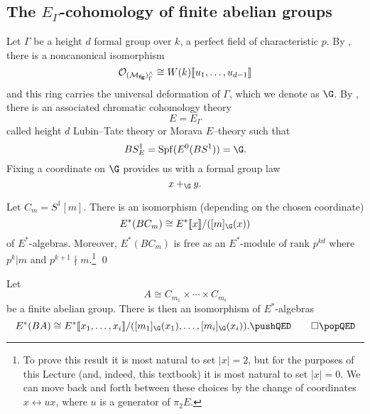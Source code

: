 
\subsection*{The \(E_{\Gamma}\)-cohomology of finite abelian groups}



Let \(\Gamma\) be a height \(d\) formal group over \(k\), a perfect field of characteristic \(p\). By , there is a noncanonical isomorphism 
\[
\mathcal{O}_{(\mathcal{M}_{\mathbf{fg}})^\wedge_\Gamma} \cong W(k)\llbracket{u_1, \ldots, u_{d-1}}\rrbracket
\] 
and this ring carries the universal deformation of \(\Gamma\), which we denote as \(\G\). By , there is an associated chromatic cohomology theory
\[
E = E_{\Gamma}
\]
called height \(d\) Lubin--Tate theory or Morava \(E\)--theory such that
\[
BS^1_E = \Spf(E^0(BS^1)) = \G.
\]
Fixing a coordinate on \(\G\) provides us with a formal group law
\[
x +_{\G} y.
\]

\begin{proposition} \label{app:cyclic}
Let \(C_{m} = S^1[m]\). There is an isomorphism (depending on the chosen coordinate) 
\[
E^*(BC_{m}) \cong E^*\ps{x}/([m]_{\G}(x))
\]
of \(E^*\)-algebras. Moreover, \(E^*(BC_{m})\) is free as an \(E^*\)-module of rank \(p^{kd}\) where \(p^k|m\) and \(p^{k+1} \nmid m\).\footnote{To prove this result it is most natural to set \(|x| = 2\), but for the purposes of this Lecture (and, indeed, this textbook) it is most natural to set \(|x| = 0\). We can move back and forth between these choices by the change of coordinates \(x \leftrightarrow ux\), where \(u\) is a generator of \(\pi_2 E\).} \pushQED\qed \qedhere \popQED
\end{proposition}

\begin{corollary} \label{app:ab}
Let 
\[
A \cong C_{m_1} \times \cdots \times C_{m_i}
\]
be a finite abelian group.  There is then an isomorphism of \(E^*\)-algebras
\[
E^*(BA) \cong E^*\ps{x_1, \ldots, x_{i}}/([m_1]_{\G}(x_1), \ldots, [m_i]_{\G}(x_i)). \pushQED\qed \qedhere \popQED
\]
\end{corollary}


